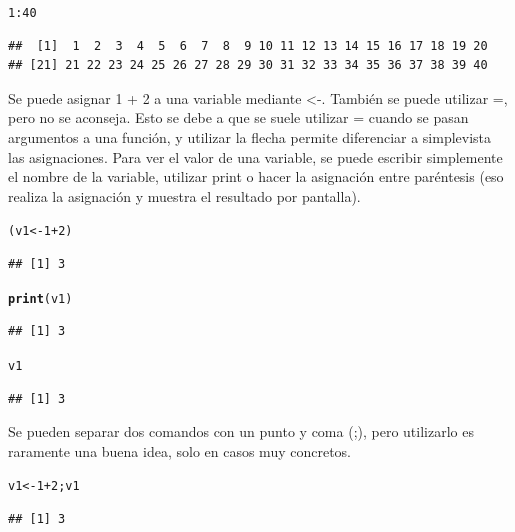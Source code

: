 \documentclass{config/apuntes}\usepackage[]{graphicx}\usepackage[]{xcolor}
\makeatletter
\newcommand{\hlnum}[1]{\textcolor[rgb]{0.686,0.059,0.569}{#1}}%
\newcommand{\hlopt}[1]{\textcolor[rgb]{0,0,0}{#1}}%
\newcommand{\hldef}[1]{\textcolor[rgb]{0.345,0.345,0.345}{#1}}%
\newcommand{\hlkwb}[1]{\textcolor[rgb]{0.69,0.353,0.396}{#1}}%
\newcommand{\hlkwd}[1]{\textcolor[rgb]{0.737,0.353,0.396}{\textbf{#1}}}%
\newenvironment{kframe}{%
 \def\at@end@of@kframe{}%
 \ifinner\ifhmode%
  \def\at@end@of@kframe{\end{minipage}}%
  \begin{minipage}{\columnwidth}%
 \fi\fi%
 \def\FrameCommand##1{\hskip\@totalleftmargin \hskip-\fboxsep
 \colorbox{shadecolor}{##1}\hskip-\fboxsep
     \hskip-\linewidth \hskip-\@totalleftmargin \hskip\columnwidth}%
 \MakeFramed {\advance\hsize-\width
   \@totalleftmargin\z@ \linewidth\hsize
   \@setminipage}}%
 {\par\unskip\endMakeFramed%
 \at@end@of@kframe}
\newenvironment{knitrout}{}{} %
\makeatother
\begin{document}
\begin{knitrout}
\color{fgcolor}\begin{kframe}
\begin{alltt}
\hlnum{1}\hlopt{:}\hlnum{40}
\end{alltt}
\begin{verbatim}
##  [1]  1  2  3  4  5  6  7  8  9 10 11 12 13 14 15 16 17 18 19 20
## [21] 21 22 23 24 25 26 27 28 29 30 31 32 33 34 35 36 37 38 39 40
\end{verbatim}
\end{kframe}
\end{knitrout}

Se puede asignar 1 + 2 a una variable mediante <-. También se puede utilizar =, pero no se aconseja. Esto se debe a que se suele utilizar = cuando se pasan argumentos a una función, y utilizar la flecha permite diferenciar a simplevista las asignaciones. Para ver el valor de una variable, se puede escribir simplemente el nombre de la variable, utilizar print o hacer la asignación entre paréntesis (eso realiza la asignación y muestra el resultado por pantalla).

\begin{knitrout}
\color{fgcolor}\begin{kframe}
\begin{alltt}
\hldef{(v1} \hlkwb{<-} \hlnum{1} \hlopt{+} \hlnum{2}\hldef{)}
\end{alltt}
\begin{verbatim}
## [1] 3
\end{verbatim}
\begin{alltt}
\hlkwd{print}\hldef{(v1)}
\end{alltt}
\begin{verbatim}
## [1] 3
\end{verbatim}
\begin{alltt}
\hldef{v1}
\end{alltt}
\begin{verbatim}
## [1] 3
\end{verbatim}
\end{kframe}
\end{knitrout}

Se pueden separar dos comandos con un punto y coma (;), pero utilizarlo es raramente una buena idea, solo en casos muy concretos. 

\begin{knitrout}
\color{fgcolor}\begin{kframe}
\begin{alltt}
\hldef{v1} \hlkwb{<-} \hlnum{1} \hlopt{+} \hlnum{2}\hldef{; v1}
\end{alltt}
\begin{verbatim}
## [1] 3
\end{verbatim}
\end{kframe}
\end{knitrout}
\end{document}
